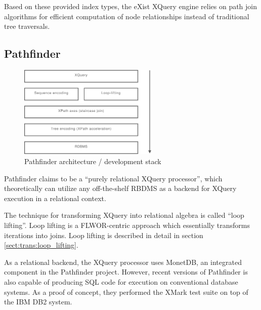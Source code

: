 Based on these provided index types, the eXist XQuery engine relies on path
join algorithms\cite{exist_idx_drv_query} for efficient computation of node
relationships instead of traditional tree traversals. 

\subsection{Pathfinder}
\label{sect:theory:pathfinder}
\begin{figure}[h]
  \centering
    \includegraphics[width=0.6\textwidth]{diagrams/pathfinder_arch}
  \caption{Pathfinder architecture / development stack}
\end{figure}
Pathfinder\cite{pathfinderHome} claims to be a ``purely relational XQuery
processor'', which theoretically can utilize any off-the-shelf RBDMS as a
backend for XQuery execution in a relational context.

The technique for transforming XQuery into relational algebra is called ``loop
lifting''\cite{pathfinder_mothertongue}. Loop lifting is a FLWOR-centric
approach which essentially transforms iterations into joins. Loop lifting is
described in detail in section \ref{sect:trans:loop_lifting}.

As a relational backend, the XQuery processor uses MonetDB, an integrated
component in the Pathfinder project. However, recent versions of Pathfinder is
also capable of producing SQL code for execution on conventional database
systems. As a proof of concept, they performed the XMark test suite on top of
the IBM DB2 system\cite{pathfinder_sql}.

